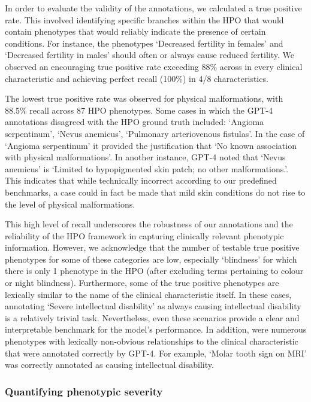 \documentclass[
]{agujournal2019}
\begin{document}
In order to evaluate the validity of the annotations, we calculated a
true positive rate. This involved identifying specific branches within
the HPO that would contain phenotypes that would reliably indicate the
presence of certain conditions. For instance, the phenotypes `Decreased
fertility in females' and `Decreased fertility in males' should often or
always cause reduced fertility. We observed an encouraging true positive
rate exceeding 88\% across in every clinical characteristic and
achieving perfect recall (100\%) in 4/8 characteristics.

The lowest true positive rate was observed for physical malformations,
with 88.5\% recall across 87 HPO phenotypes. Some cases in which the
GPT-4 annotations disagreed with the HPO ground truth included: `Angioma
serpentinum', `Nevus anemicus', `Pulmonary arteriovenous fistulas'. In
the case of `Angioma serpentinum' it provided the justification that `No
known association with physical malformations'. In another instance,
GPT-4 noted that `Nevus anemicus' is `Limited to hypopigmented skin
patch; no other malformations.'. This indicates that while technically
incorrect according to our predefined benchmarks, a case could in fact
be made that mild skin conditions do not rise to the level of physical
malformations.

This high level of recall underscores the robustness of our annotations
and the reliability of the HPO framework in capturing clinically
relevant phenotypic information. However, we acknowledge that the number
of testable true positive phenotypes for some of these categories are
low, especially `blindness' for which there is only 1 phenotype in the
HPO (after excluding terms pertaining to colour or night blindness).
Furthermore, some of the true positive phenotypes are lexically similar
to the name of the clinical characteristic itself. In these cases,
annotating `Severe intellectual disability' as always causing
intellectual disability is a relatively trivial task. Nevertheless, even
these scenarios provide a clear and interpretable benchmark for the
model's performance. In addition, were numerous phenotypes with
lexically non-obvious relationships to the clinical characteristic that
were annotated correctly by GPT-4. For example, `Molar tooth sign on
MRI' was correctly annotated as causing intellectual disability.

\subsubsection{Quantifying phenotypic
severity}\label{quantifying-phenotypic-severity}
\end{document}

